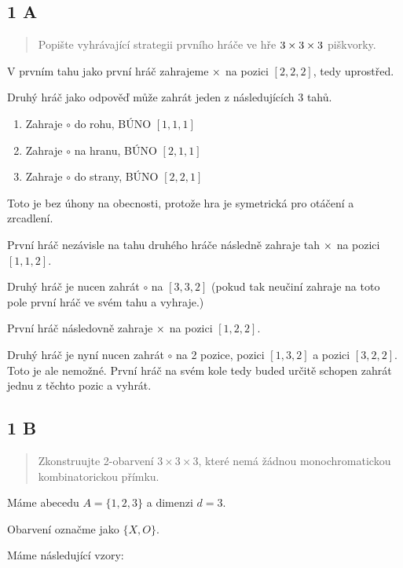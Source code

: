 \documentclass[../main.tex]{subfiles}
\begin{document}
\subsection*{1 A}


\begin{quote}
    Popište vyhrávající strategii prvního hráče ve hře $3 \times 3 \times 3$ piškvorky.
\end{quote}


V prvním tahu jako první hráč zahrajeme $\times$ na pozici $[2,2,2]$, tedy uprostřed.

Druhý hráč jako odpověď může zahrát jeden z následujících 3 tahů.
\begin{enumerate}
    \item Zahraje $\circ$ do rohu, BÚNO $[1,1,1]$
    \item Zahraje $\circ$ na hranu, BÚNO $[2,1,1]$
    \item Zahraje $\circ$ do strany, BÚNO $[2,2,1]$
\end{enumerate}
Toto je bez úhony na obecnosti, protože hra je symetrická pro otáčení a zrcadlení.

První hráč nezávisle na tahu druhého hráče následně zahraje tah $\times$ na pozici $[1,1,2]$.

Druhý hráč je nucen zahrát $\circ$ na $[3,3,2]$ (pokud tak neučiní zahraje na toto pole první hráč ve svém tahu a vyhraje.)

První hráč následovně zahraje $\times$ na pozici $[1,2,2]$. 

Druhý hráč je nyní nucen zahrát $\circ$ na 2 pozice, pozici $[1,3,2]$ a pozici $[3,2,2]$. Toto je ale nemožné. 
První hráč na svém kole tedy buded určitě schopen zahrát jednu z těchto pozic a vyhrát.

\subsection*{1 B}

\begin{quote}
    Zkonstruujte 2-obarvení $3 \times 3 \times 3$, 
    které nemá žádnou monochromatickou kombinatorickou přímku.
    
\end{quote}

Máme abecedu $A = \{ 1,2,3 \}$ a dimenzi $d = 3$. 

Obarvení označme jako $\{X, O\}$.

Máme následující vzory:
\end{document}
